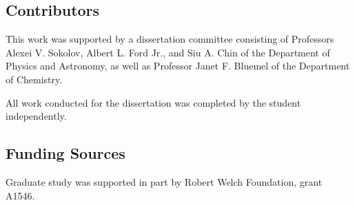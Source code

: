 \subsection*{Contributors}
This work was supported by a dissertation committee consisting of Professors Alexei V. Sokolov, Albert L. Ford Jr., and Siu A. Chin of the Department of Physics and Astronomy, as well as Professor Janet F. Bluemel of the Department of Chemistry.


All work conducted for the dissertation was completed by the student independently.
\subsection*{Funding Sources}
Graduate study was supported in part by Robert Welch Foundation, grant A1546.
\pagebreak{}